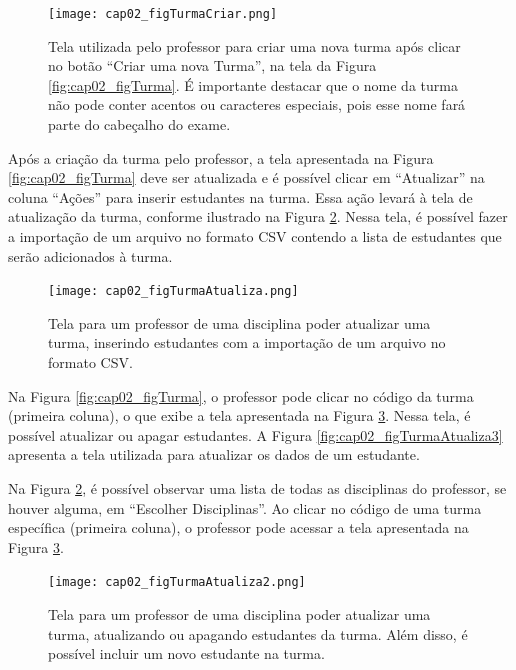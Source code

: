 \begin{figure}[!ht]
  \centering
  \texttt{[image: cap02\_figTurmaCriar.png]}
  \caption{Tela utilizada pelo professor para criar uma nova turma após clicar no botão ``Criar uma nova Turma'', na tela da Figura \ref{fig:cap02_figTurma}. É importante destacar que o nome da turma não pode conter acentos ou caracteres especiais, pois esse nome fará parte do cabeçalho do exame.}
  \label{fig:cap02_figTurmaCriar}
\end{figure}

Após a criação da turma pelo professor, a tela apresentada na Figura \ref{fig:cap02_figTurma} deve ser atualizada e é possível clicar em ``Atualizar'' na coluna ``Ações'' para inserir estudantes na turma. Essa ação levará à tela de atualização da turma, conforme ilustrado na Figura \ref{fig:cap02_figTurmaAtualiza}. Nessa tela, é possível fazer a importação de um arquivo no formato CSV contendo a lista de estudantes que serão adicionados à turma.

\begin{figure}[!ht]
  \centering
  \texttt{[image: cap02\_figTurmaAtualiza.png]}
  \caption{Tela para um professor de uma disciplina poder atualizar uma turma, inserindo estudantes com a importação de um arquivo no formato CSV.}
  \label{fig:cap02_figTurmaAtualiza}
\end{figure}

Na Figura \ref{fig:cap02_figTurma}, o professor pode clicar no código da turma (primeira coluna), o que exibe a tela apresentada na Figura \ref{fig:cap02_figTurmaAtualiza2}. Nessa tela, é possível atualizar ou apagar estudantes. A Figura \ref{fig:cap02_figTurmaAtualiza3} apresenta a tela utilizada para atualizar os dados de um estudante.

Na Figura \ref{fig:cap02_figTurmaAtualiza}, é possível observar uma lista de todas as disciplinas do professor, se houver alguma, em ``Escolher Disciplinas''. Ao clicar no código de uma turma específica (primeira coluna), o professor pode acessar a tela apresentada na Figura \ref{fig:cap02_figTurmaAtualiza2}.


\begin{figure}[!ht]
  \centering
  \texttt{[image: cap02\_figTurmaAtualiza2.png]}
  \caption{Tela para um professor de uma disciplina poder atualizar uma turma, atualizando ou apagando estudantes da turma. Além disso, é possível incluir um novo estudante na turma.}
  \label{fig:cap02_figTurmaAtualiza2}
\end{figure}

